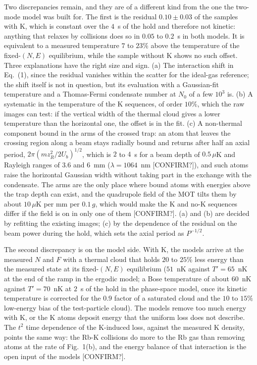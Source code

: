 Two discrepancies remain, and they are of a different kind from the one
the two-mode model was built for. The first is the residual $0.10\pm0.03$ of
the samples with K, which is constant over the $4$~s of the hold and
therefore not kinetic: anything that relaxes by collisions does so in
$0.05$ to $0.2$~s in both models. It is equivalent to a measured
temperature $7$ to $23\%$ above the temperature of the fixed-$(N,E)$
equilibrium, while the sample without K shows no such offset. Three
explanations have the right size and sign. (a) The interaction shift in
Eq.~(1), since the residual vanishes within the scatter for the ideal-gas
reference; the shift itself is not in question, but its evaluation with a
Gaussian-fit temperature and a Thomas-Fermi condensate number at $N_0$ of a
few $10^3$ is. (b) A systematic in the temperature of the K sequences,
of order $10\%$, which the raw images can test: if the vertical width of
the thermal cloud gives a lower temperature than the horizontal one, the
offset is in the fit. (c) A non-thermal component bound in the arms of the
crossed trap: an atom that leaves the crossing region along a beam stays
radially bound and returns after half an axial period, $2\pi(mz_R^2/2U_b)^{1/2}$,
which is $2$ to $4$~s for a beam depth of $0.5\,\mu$K and
Rayleigh ranges of $3.6$ and $6$~mm ($\lambda=1064$~nm [CONFIRM?]), and
such atoms raise the horizontal Gaussian width without taking part in the
exchange with the condensate. The arms are the only place where bound
atoms with energies above the trap depth can exist, and the quadrupole
field of the MOT tilts them by about $10\,\mu$K per mm per $0.1\,g$, which
would make the K and no-K sequences differ if the field is on in only one
of them [CONFIRM?]. (a) and (b) are decided by refitting the existing
images; (c) by the dependence of the residual on the beam power during the
hold, which sets the axial period as $P^{-1/2}$.

The second discrepancy is on the model side. With K, the models arrive at
the measured $N$ and $F$ with a thermal cloud that holds $20$ to $25\%$ less
energy than the measured state at its fixed-$(N,E)$ equilibrium ($51$~nK
against $T'=65$~nK at the end of the ramp in the ergodic model; a Bose
temperature of about $60$~nK against $T'=70$~nK at $2$~s of the hold in the
phase-space model, once its kinetic temperature is corrected for the $0.9$
factor of a saturated cloud and the $10$ to $15\%$ low-energy bias of the
test-particle cloud). The models remove too much energy with K, or the K
atoms deposit energy that the uniform loss does not describe. The $t^2$ time
dependence of the K-induced loss, against the measured K density, points the
same way: the Rb-K collisions do more to the Rb gas than removing atoms at
the rate of Fig.~1(b), and the energy balance of that interaction is the
open input of the models [CONFIRM?].

